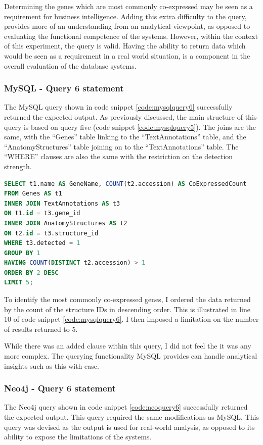 Determining the genes which are most commonly co-expressed may be seen as a requirement for business intelligence. Adding this extra difficulty to the query, provides more of an understanding from an analytical viewpoint, as opposed to evaluating the functional competence of the systems. However, within the context of this experiment, the query is valid. Having the ability to return data which would be seen as a requirement in a real world situation, is a component in the overall evaluation of the database systems.

\subsubsection*{MySQL - Query 6 statement}\label{mysqlquery6statement}
The MySQL query shown in code snippet \ref{code:mysqlquery6} successfully returned the expected output. As previously discussed, the main structure of this query is based on query five (code snippet \ref{code:mysqlquery5}). The joins are the same, with the ``Genes'' table linking to the ``TextAnnotations'' table, and the ``AnatomyStructures'' table joining on to the ``TextAnnotations'' table. The ``WHERE'' clauses are also the same with the restriction on the detection strength.

\begin{lstlisting}[language=SQL, caption=MySQL query 6 statement. Which Genes are most commonly co-expressed?., label=code:mysqlquery6]
SELECT t1.name AS GeneName, COUNT(t2.accession) AS CoExpressedCount
FROM Genes AS t1
INNER JOIN TextAnnotations AS t3
ON t1.id = t3.gene_id
INNER JOIN AnatomyStructures AS t2
ON t2.id = t3.structure_id
WHERE t3.detected = 1
GROUP BY 1
HAVING COUNT(DISTINCT t2.accession) > 1
ORDER BY 2 DESC
LIMIT 5;
\end{lstlisting}

To identify the most commonly co-expressed genes, I ordered the data returned by the count of the structure IDs in descending order. This is illustrated in line 10 of code snippet \ref{code:mysqlquery6}. I then imposed a limitation on the number of results returned to 5.

While there was an added clause within this query, I did not feel the it was any more complex. The querying functionality MySQL provides can handle analytical insights such as this with ease.
\newpage
\subsubsection*{Neo4j - Query 6 statement}\label{neoquery6statement}
The Neo4j query shown in code snippet \ref{code:neoquery6} successfully returned the expected output. This query required the same modifications as MySQL. This query was devised as the output is used for real-world analysis, as opposed to its ability to expose the limitations of the systems.

